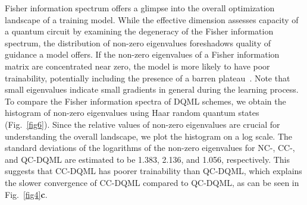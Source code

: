 \documentclass[aps,prx,reprint,amsmath,amssymb,superscriptaddress,nobibnotes,showpacs]{revtex4-2}
\begin{document}
Fisher information spectrum offers a glimpse into the overall optimization landscape of a training model. While the effective dimension assesses capacity of a quantum circuit by examining the degeneracy of the Fisher information spectrum, the distribution of non-zero eigenvalues foreshadows quality of guidance a model offers.
If the non-zero eigenvalues of a Fisher information matrix are concentrated near zero, the model is more likely to have poor trainability, potentially including the presence of a barren plateau~\cite{haug2021capacity,huembeli2021characterizing}. Note that small eigenvalues indicate small gradients in general during the learning process. To compare the Fisher information spectra of DQML schemes, we obtain the histogram of non-zero eigenvalues using Haar random quantum states (Fig.~\ref{fig6}). Since the relative values of non-zero eigenvalues are crucial for understanding the overall landscape, we plot the histogram on a log scale. The standard deviations of the logarithms of the non-zero eigenvalues for NC-, CC-, and QC-DQML are estimated to be 1.383, 2.136, and 1.056, respectively. This suggests that CC-DQML has  poorer trainability than QC-DQML, which explains the slower convergence of CC-DQML compared to QC-DQML, as can be seen in Fig.~\ref{fig4}\textbf{c}.




\bigskip



\end{document}
